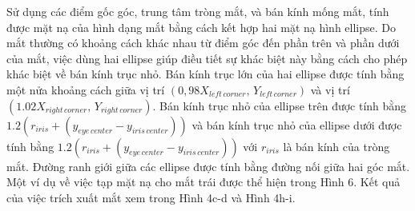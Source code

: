\documentclass[journal]{IEEEtran}
\begin{document}
Sử dụng các điểm gốc góc, trung tâm tròng mắt, và bán kính mống mắt, tính được mặt nạ của hình dạng mắt bằng cách kết hợp hai mặt nạ hình ellipse. Do mắt thường có khoảng cách khác nhau từ điểm góc đến phần trên và phần dưới của mắt, việc dùng hai ellipse giúp điều tiết sự khác biệt này bằng cách cho phép khác biệt về bán kính trục nhỏ. Bán kính trục lớn của hai ellipse được tính bằng một nửa khoảng cách giữa vị trí $(0,98X_{left\, corner},\, Y_{left\, corner})$ và vị trí $(1.02X_{right\, corner}, \, Y_{right\,corner})$. Bán kính trục nhỏ của ellipse trên được tính bằng $1.2(r_{iris}+(y_{eye\,center}-y_{iris\,center}))$ và bán kính trục nhỏ của ellipse dưới được tính bằng $1.2(r_{iris}+(y_{eye\,center}-y_{iris\,center}))$ với $r_{iris}$ là bán kính của tròng mắt. Đường ranh giới giữa các ellipse được tính bằng đường nối giữa hai góc mắt. Một ví dụ về việc tạp mặt nạ cho mắt trái được thể hiện trong Hình 6. Kết quả của việc trích xuất mắt xem trong Hình 4c-d và Hình 4h-i.
\end{document}

